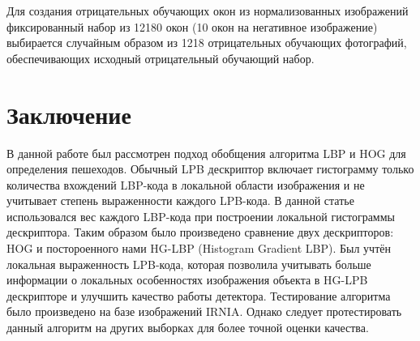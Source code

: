 \documentclass[12pt,twoside]{article}
\begin{document}
Для создания отрицательных обучающих окон из нормализованных изображений фиксированный набор из 12180 окон (10 окон на негативное изображение) выбирается случайным образом из 1218 отрицательных обучающих фотографий, обеспечивающих исходный отрицательный обучающий набор.



\section{Заключение}
В данной работе был рассмотрен подход обобщения алгоритма LBP и HOG для определения пешеходов. Обычный LPB дескриптор включает гистограмму только количества вхождений LBP-кода в локальной области изображения и не учитывает степень выраженности каждого LPB-кода. В данной статье использовался вес каждого LBP-кода при построении локальной гистограммы дескриптора. Таким образом было произведено сравнение двух дескрипторов: HOG и постороенного нами HG-LBP (Histogram Gradient LBP). Был учтён локальная выраженность LPB-кода, которая позволила учитывать больше информации о локальных особенностях изображения объекта в HG-LPB дескрипторе и улучшить качество работы детектора. Тестирование алгоритма было произведено на базе изображений IRNIA. Однако следует протестировать данный алгоритм на других выборках для более точной оценки качества. 


\bigskip
\maketitleSecondary



\end{document}
